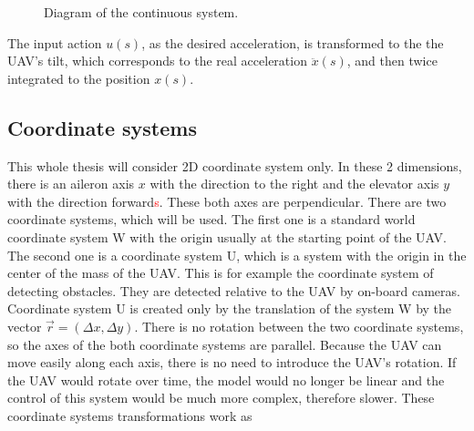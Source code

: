 \documentclass[a4paper,11pt,titlepage]{article}
\begin{document}
\begin{figure}[h]
\centering
{}
\caption{Diagram of the continuous system.}
\label{fig:LTI}
\end{figure}

The input action $u(s)$, as the desired acceleration, is transformed to the the UAV's tilt, which corresponds to the real acceleration $\ddot{x}(s)$, and then twice integrated to the position ${x}(s)$.



\subsection{Coordinate systems}
\label{ssec:coordinate_system}
This whole thesis will consider 2D coordinate system only. In these 2 dimensions, there is an aileron axis $x$ with the direction to the right and the elevator axis $y$ with the direction forward\textcolor{red}{s}. These both axes are perpendicular. There are two coordinate systems, which will be used. The first one is a standard world coordinate system W with the origin usually at the starting point of the UAV. The second one is a coordinate system U, which is a system with the origin in the center of the mass of the UAV. This is for example the coordinate system of detecting obstacles. They are detected relative to the UAV by on-board cameras. Coordinate system U is created only by the translation of the system W by the vector $\vec{r} = (\Delta x, \Delta y)$. There is no rotation between the two coordinate systems, so the axes of the both coordinate systems are parallel. Because the UAV can move easily along each axis, there is no need to introduce the UAV's rotation. If the UAV would rotate over time, the model would no longer be linear and the control of this system would be much more complex, therefore slower. These coordinate systems transformations work as
\end{document}
